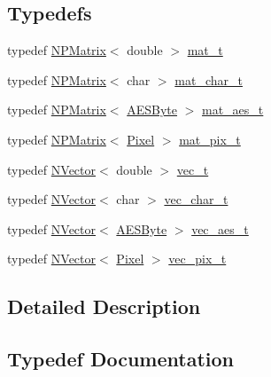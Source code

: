\subsection*{Typedefs}
\begin{DoxyCompactItemize}
\item 
typedef \mbox{\hyperlink{class_n_p_matrix}{N\+P\+Matrix}}$<$ double $>$ \mbox{\hyperlink{group___n_algebra_ga44dfb60c1e03b44e98a332fb2ae71947}{mat\+\_\+t}}
\item 
typedef \mbox{\hyperlink{class_n_p_matrix}{N\+P\+Matrix}}$<$ char $>$ \mbox{\hyperlink{group___n_algebra_ga8904016e562c4e316f7bcff635bebd4a}{mat\+\_\+char\+\_\+t}}
\item 
typedef \mbox{\hyperlink{class_n_p_matrix}{N\+P\+Matrix}}$<$ \mbox{\hyperlink{class_a_e_s_byte}{A\+E\+S\+Byte}} $>$ \mbox{\hyperlink{group___n_algebra_gac6131d6d5225e82316dde948e5314ede}{mat\+\_\+aes\+\_\+t}}
\item 
typedef \mbox{\hyperlink{class_n_p_matrix}{N\+P\+Matrix}}$<$ \mbox{\hyperlink{class_pixel}{Pixel}} $>$ \mbox{\hyperlink{group___n_algebra_ga173b3bd738ed7a0a509c8d6f9ad65c5b}{mat\+\_\+pix\+\_\+t}}
\item 
typedef \mbox{\hyperlink{class_n_vector}{N\+Vector}}$<$ double $>$ \mbox{\hyperlink{group___n_algebra_ga0a2cfc67e738a3d73e4f12098c4c07f6}{vec\+\_\+t}}
\item 
typedef \mbox{\hyperlink{class_n_vector}{N\+Vector}}$<$ char $>$ \mbox{\hyperlink{group___n_algebra_ga4be4d9f61d1c170b61a0a4bdeccac8f1}{vec\+\_\+char\+\_\+t}}
\item 
typedef \mbox{\hyperlink{class_n_vector}{N\+Vector}}$<$ \mbox{\hyperlink{class_a_e_s_byte}{A\+E\+S\+Byte}} $>$ \mbox{\hyperlink{group___n_algebra_gad347c291514f4b97d883742568d3f8a7}{vec\+\_\+aes\+\_\+t}}
\item 
typedef \mbox{\hyperlink{class_n_vector}{N\+Vector}}$<$ \mbox{\hyperlink{class_pixel}{Pixel}} $>$ \mbox{\hyperlink{group___n_algebra_gabd4c731d10a091af31f8476c9143c453}{vec\+\_\+pix\+\_\+t}}
\end{DoxyCompactItemize}


\subsection{Detailed Description}


\subsection{Typedef Documentation}
\mbox{\label{group___n_algebra_ga44dfb60c1e03b44e98a332fb2ae71947}} 
